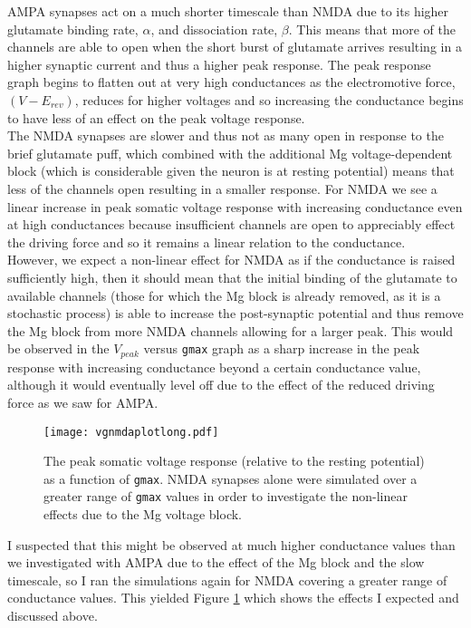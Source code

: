 \documentclass[paper=a4, fontsize=11pt]{scrartcl} %
\numberwithin{equation}{section} %
\numberwithin{figure}{section} %
\numberwithin{table}{section} %
\begin{document}
AMPA synapses act on a much shorter timescale than NMDA due to its higher glutamate binding rate, $\alpha$, and dissociation rate, $\beta$. This means that more of the channels are able to open when the short burst of glutamate arrives resulting in a higher synaptic current and thus a higher peak response. The peak response graph begins to flatten out at very high conductances as the electromotive force, $(V-E_{rev})$, reduces for higher voltages and so increasing the conductance begins to have less of an effect on the peak voltage response.\\

The NMDA synapses are slower and thus not as many open in response to the brief glutamate puff, which combined with the additional Mg voltage-dependent block (which is considerable given the neuron is at resting potential) means that less of the channels open resulting in a smaller response. For NMDA we see a linear increase in peak somatic voltage response with increasing conductance even at high conductances because insufficient channels are open to appreciably effect the driving force and so it remains a linear relation to the conductance.\\

However, we expect a non-linear effect for NMDA as if the conductance is raised sufficiently high, then it should mean that the initial binding of the glutamate to available channels (those for which the Mg block is already removed, as it is a stochastic process) is able to increase the post-synaptic potential and thus remove the Mg block from more NMDA channels allowing for a larger peak. This would be observed in the $V_{peak}$ versus \texttt{gmax} graph as a sharp increase in the peak response with increasing conductance beyond a certain conductance value, although it would eventually level off due to the effect of the reduced driving force as we saw for AMPA.\\

\begin{figure}[!h]
\centering
\texttt{[image: vgnmdaplotlong.pdf]}
  \caption{The peak somatic voltage response (relative to the resting potential) as a function of \texttt{gmax}. NMDA synapses alone were simulated over a greater range of \texttt{gmax} values in order to investigate the non-linear effects due to the Mg voltage block.}
  \label{fig:vgnmdaplotlong}
\end{figure}

I suspected that this might be observed at much higher conductance values than we investigated with AMPA due to the effect of the Mg block and the slow timescale, so I ran the simulations again for NMDA covering a greater range of conductance values. This yielded Figure \ref{fig:vgnmdaplotlong} which shows the effects I expected and discussed above.
\end{document}
